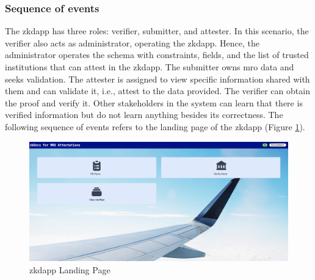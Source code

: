 \subsubsection{Sequence of events}
The \acrshort{zkdapp} has three roles: verifier, submitter, and attester. In this scenario, the verifier also acts as administrator, operating the \acrshort{zkdapp}. Hence, the administrator operates the schema with constraints, fields, and the list of trusted institutions that can attest in the \acrshort{zkdapp}. The submitter owns \acrshort{mro} data and seeks validation. The attester is assigned to view specific information shared with them and can validate it, i.e., attest to the data provided. The verifier can obtain the proof and verify it. Other stakeholders in the system can learn that there is verified information but do not learn anything besides its correctness. The following sequence of events refers to the landing page of the \acrshort{zkdapp} (Figure \ref{fig:landing-page}).
\begin{figure}[hbt]
	\centering
		\includegraphics[width=1.0\textwidth]{Pictures/landingpage.png}
	\caption{\acrshort{zkdapp} Landing Page}
	\label{fig:landing-page}
\end{figure}
